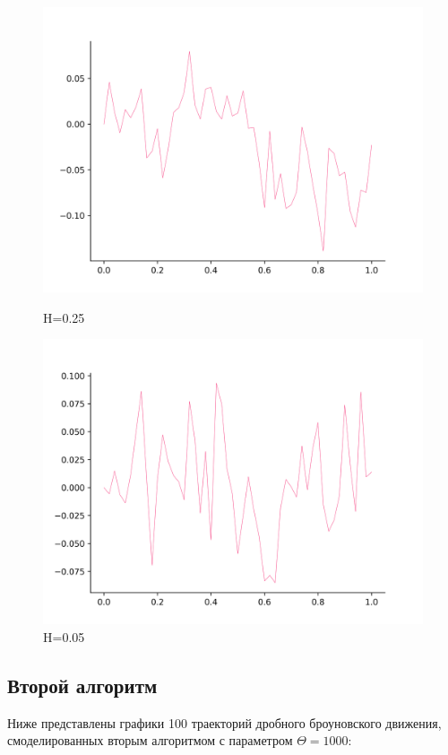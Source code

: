 \documentclass[a4paper,12pt]{article}
\numberwithin{equation}{section}
\begin{document}
	\begin{figure}[H]
		\includegraphics[scale=0.4]{mean-1-25.png}
		\caption{H=0.25}
		\endminipage\hfill
		\includegraphics[scale=0.4]{mean-1-05.png}
		\caption{H=0.05}
		\endminipage\hfill
	\end{figure}
	
	\subsection{Второй алгоритм}
	Ниже представлены графики 100 траекторий дробного броуновского движения, смоделированных вторым алгоритмом с параметром $\Theta = 1000$:
	
\end{document}
